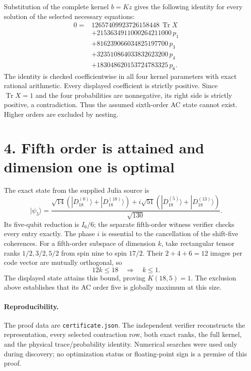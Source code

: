 \documentclass[11pt]{article}
\newcommand{\Tr}{\operatorname{Tr}}
\begin{document}
Substitution of the complete kernel $b=Kz$ gives the following identity
for every solution of the selected necessary equations:
\begin{align*}
 0={}&12657409923726158448\,\Tr X\\
 &+2153634911000264211000\,p_1\\
 &+816239066034825197700\,p_3\\
 &+323510864033832623200\,p_4\\
 &+183048620153724783325\,p_6.
\end{align*}
The identity is checked coefficientwise in all four kernel parameters with
exact rational arithmetic. Every displayed coefficient is strictly
positive. Since $\Tr X=1$ and the four probabilities are nonnegative, its
right side is strictly positive, a contradiction. Thus the assumed
sixth-order AC state cannot exist. Higher orders are excluded by nesting.

\section*{4. Fifth order is attained and dimension one is optimal}
The exact state from the supplied Julia source is
\[
 |\psi_5\rangle=
 \frac{\sqrt{14}(|D_{18}^{(0)}\rangle+|D_{18}^{(18)}\rangle)
 +i\sqrt{51}(|D_{18}^{(5)}\rangle+|D_{18}^{(13)}\rangle)}{\sqrt{130}}.
\]
Its five-qubit reduction is $I_6/6$; the separate fifth-order witness
verifier checks every entry exactly. The phase $i$ is essential to the
cancellation of the shift-five coherences.
For a fifth-order subspace of dimension $k$, take rectangular tensor ranks
$1/2,3/2,5/2$ from spin nine to spin $17/2$. Their $2+4+6=12$ images per
code vector are mutually orthogonal, so
\[
 12k\le18\quad\Longrightarrow\quad k\le1.
\]
The displayed state attains this bound, proving $K(18,5)=1$. The exclusion
above establishes that its AC order five is globally maximum at this size.

\paragraph{Reproducibility.}
The proof data are \texttt{certificate.json}. The independent verifier
reconstructs the representation, every selected contraction row, both
exact ranks, the full kernel, and the physical trace/probability identity.
Numerical searches were used only during discovery; no optimization
status or floating-point sign is a premise of this proof.
\end{document}
